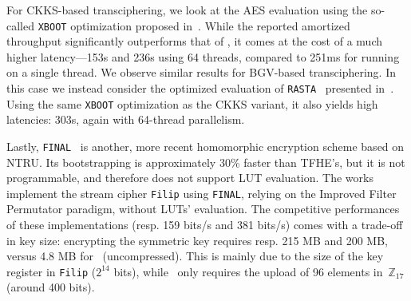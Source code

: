 For CKKS-based transciphering, we look at the AES evaluation using the so-called \texttt{XBOOT} optimization proposed in~\cite{EPRINT:NHYCKH25}. While the reported amortized throughput significantly outperforms that of \coolName, it comes at the cost of a much higher latency—153s and 236s using 64 threads, compared to 251ms for \coolName running on a single thread. We observe similar results for  BGV-based transciphering. In this case we instead consider the optimized evaluation of \texttt{RASTA}~\cite{C:DEGLLL18} presented in~\cite{EPRINT:NHYCKH25}. Using the same \texttt{XBOOT} optimization as the CKKS variant, it also yields high latencies: 303s, again with 64-thread parallelism. 


Lastly, \texttt{FINAL}~\cite{AC:BIPPS22} is another, more recent homomorphic encryption scheme based on NTRU. Its bootstrapping is approximately 30\% faster than TFHE’s, but it is not programmable, and therefore does not support LUT evaluation. The works~\cite{CiC:MeaParPer24,CCS:CDPP22} implement the stream cipher \texttt{Filip} using \texttt{FINAL}, relying on the Improved Filter Permutator paradigm, without LUTs' evaluation. The competitive performances of these implementations (resp. 159 bits/s and 381 bits/s) comes with a trade-off in key size: encrypting the symmetric key requires resp. 215 MB and 200 MB, versus 4.8 MB for \coolName~(uncompressed). This is mainly due to the size of the key register in \texttt{Filip} ($2^{14}$ bits), while \coolName~only requires the upload of 96 elements in~$\mathbb{Z}_{17}$ (around 400 bits).


